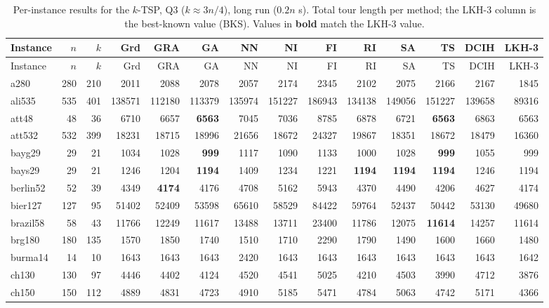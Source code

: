 {\footnotesize\setlength{\tabcolsep}{3pt}
\begin{longtable}{l r r r r r r r r r r r r r}
\caption{Per-instance results for the $k$-TSP, Q3 ($k\approx 3n/4$), long run ($0.2n$ s). Total tour length per method; the LKH-3 column is the best-known value (BKS). Values in \textbf{bold} match the LKH-3 value.}\label{tab:app_lr_large}\\
\hline Instance & $n$ & $k$ & Grd & GRA & GA & NN & NI & FI & RI & SA & TS & DCIH & LKH-3 \\ \hline \endfirsthead
\hline Instance & $n$ & $k$ & Grd & GRA & GA & NN & NI & FI & RI & SA & TS & DCIH & LKH-3 \\ \hline \endhead
\hline \endfoot
a280 & 280 & 210 & 2011 & 2088 & 2078 & 2057 & 2174 & 2345 & 2102 & 2075 & 2166 & 2167 & 1845 \\
ali535 & 535 & 401 & 138571 & 112180 & 113379 & 135974 & 151227 & 186943 & 134138 & 149056 & 151227 & 139658 & 89316 \\
att48 & 48 & 36 & 6710 & 6657 & \textbf{6563} & 7045 & 7036 & 8785 & 6878 & 6721 & \textbf{6563} & 6863 & 6563 \\
att532 & 532 & 399 & 18231 & 18715 & 18996 & 21656 & 18672 & 24327 & 19867 & 18351 & 18672 & 18479 & 16360 \\
bayg29 & 29 & 21 & 1034 & 1028 & \textbf{999} & 1117 & 1090 & 1133 & 1000 & 1028 & \textbf{999} & 1055 & 999 \\
bays29 & 29 & 21 & 1246 & 1204 & \textbf{1194} & 1409 & 1234 & 1221 & \textbf{1194} & \textbf{1194} & \textbf{1194} & 1246 & 1194 \\
berlin52 & 52 & 39 & 4349 & \textbf{4174} & 4176 & 4708 & 5162 & 5943 & 4370 & 4490 & 4206 & 4627 & 4174 \\
bier127 & 127 & 95 & 51402 & 52409 & 53598 & 65610 & 58529 & 84422 & 59764 & 52437 & 50442 & 53130 & 49680 \\
brazil58 & 58 & 43 & 11766 & 12249 & 11617 & 13488 & 13711 & 23400 & 11786 & 12075 & \textbf{11614} & 14257 & 11614 \\
brg180 & 180 & 135 & 1570 & 1850 & 1740 & 1510 & 1710 & 2290 & 1790 & 1490 & 1600 & 1660 & 1480 \\
burma14 & 14 & 10 & 1643 & 1643 & 1643 & 2420 & 1643 & 1643 & 1643 & 1643 & 1643 & 1643 & 1642 \\
ch130 & 130 & 97 & 4446 & 4402 & 4124 & 4520 & 4541 & 5025 & 4210 & 4503 & 3990 & 4712 & 3876 \\
ch150 & 150 & 112 & 4889 & 4831 & 4723 & 4910 & 5185 & 5471 & 4784 & 5063 & 4742 & 5171 & 4366 \\

\end{longtable}}

